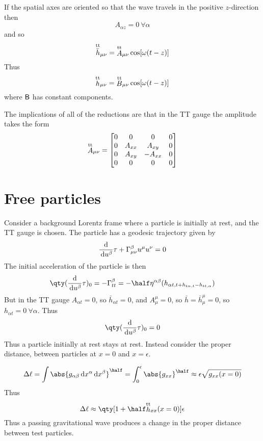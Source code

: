 If the spatial axes are oriented so that the wave travels in the
positive $z$-direction then
\[ A_{\alpha z} = 0 \ \forall \alpha \]
and so
\begin{equation}
  \label{eq:23}
  {\mathop{\bar{h}}^{\text{\scriptsize{tt}}}}_{\mu \nu} = {\mathop{A}^{\text{\scriptsize{tt}}}}_{\mu \nu} \cos[ \omega(t-z) ]
\end{equation}
Thus
\begin{equation}
  \label{eq:24}
  {\mathop{h}^{\text{\scriptsize{tt}}}}_{\mu \nu} = {\mathop{B}^{\text{\scriptsize{tt}}}}_{\mu \nu} \cos[ \omega(t-z) ]
\end{equation}
where $\mathsf{{B}}$ has constant components.

The implications of all of the reductions are that in the TT gauge the
amplitude takes the form
\begin{equation}
  \label{eq:25}
  {\mathop{A}^{\text{\scriptsize{tt}}}}_{\mu \nu} =
  \begin{bmatrix}
     0 & 0      & 0       & 0 \\
0      & A_{xx} & A_{xy}  & 0 \\
0      & A_{xy} & -A_{xx} & 0 \\
0      & 0      & 0       & 0
  \end{bmatrix}
\end{equation}

\section{Free particles}
\label{sec:free-particles}

Consider a background Lorentz frame where a particle is initially at
rest, and the TT gauge is chosen. The particle has a geodesic
trajectory given by
\[ \frac{\mathrm{d}}{\,\mathrm{d} u^{\beta}}{\tau} + \Gamma^{\beta}_{\mu \nu} u^{\mu} u^{\nu} = 0 \]
The initial acceleration of the particle is then
\[ \qty( \dv{u^{\beta}}{\tau})_0 = - \Gamma^{\beta}_{tt} = -\half \eta^{\alpha \beta} (h_{\alpha t,t + h_{t \alpha, t} - h_{t t, \alpha}} )\]
But in the TT gauge $A_{\alpha t}=0$, so $\bar{h}_{\alpha t} = 0$, and $A_{\mu}^{\mu} = 0$, so $\bar{h} = \bar{h}_{\mu}^{\mu} = 0$, so $h_{\alpha t} = 0 \ \forall \alpha$. Thus
\[ \qty( \dv{u^{\beta}}{\tau})_0 = 0 \] Thus a particle initially at
rest stays at rest. Instead consider the proper distance, between
particles at $x=0$ and $x=\epsilon$.

\begin{equation*}
  \label{eq:26}
  \Delta \ell = \int \abs{ g_{\alpha \beta} \dd{x^{\alpha}} \dd{x^{\beta}}}^{\half} = \int_0^{\epsilon} \abs{g_{xx}}^{\half} \approx \epsilon \sqrt{g_{xx}(x=0)} 
\end{equation*}
Thus
\begin{equation}
  \label{eq:27}
  \Delta \ell \approx \qty[ 1 + \half \trt{h}_{xx} (x=0)] \epsilon
\end{equation}
Thus a passing gravitational wave produces a change in the proper
distance between test particles.

